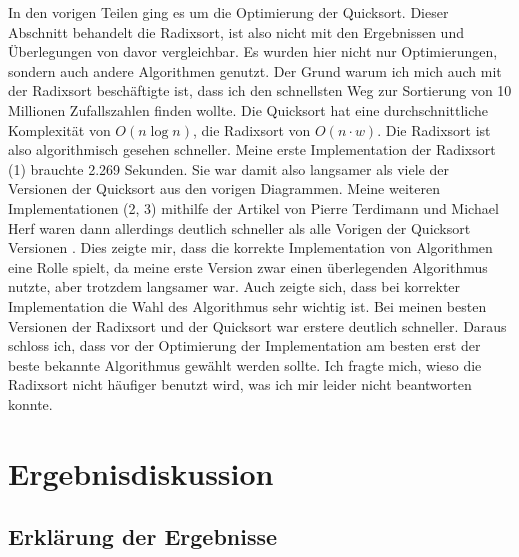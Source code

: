 \documentclass[11pt,a4paper]{article}
\begin{document}
\begin{bchart}[min=0, max=2.5, scale=1.9]
    \smallskip
    \smallskip
    \smallskip
\end{bchart}

In den vorigen Teilen ging es um die Optimierung der Quicksort. Dieser Abschnitt
behandelt die Radixsort, ist also nicht mit den Ergebnissen und Überlegungen von davor vergleichbar.
Es wurden hier nicht nur Optimierungen, sondern auch andere Algorithmen genutzt.
Der Grund warum ich mich auch mit der Radixsort beschäftigte ist, dass ich
den schnellsten Weg zur Sortierung von 10 Millionen Zufallszahlen finden wollte.
Die Quicksort hat eine durchschnittliche Komplexität von \boldmath$O(n\log n)$,
die Radixsort von \boldmath$O(n \cdot w)$. Die Radixsort ist also algorithmisch gesehen schneller.
Meine erste Implementation der Radixsort (1) brauchte 2.269 Sekunden. Sie war damit
also langsamer als viele der Versionen der Quicksort aus den vorigen Diagrammen.
Meine weiteren Implementationen (2, 3) mithilfe der Artikel von Pierre Terdimann und
Michael Herf waren dann allerdings deutlich schneller als alle Vorigen der Quicksort Versionen
\cite{terdiman} \cite{michael}.
Dies zeigte mir, dass die korrekte Implementation von Algorithmen eine Rolle spielt,
da meine erste Version zwar einen überlegenden Algorithmus nutzte, aber trotzdem
langsamer war. Auch zeigte sich, dass bei korrekter Implementation die Wahl des
Algorithmus sehr wichtig ist. Bei meinen besten Versionen der Radixsort und der Quicksort
war erstere deutlich schneller. Daraus schloss ich, dass vor der Optimierung der
Implementation am besten erst der beste bekannte Algorithmus gewählt werden sollte.
Ich fragte mich, wieso die Radixsort nicht häufiger benutzt wird, was ich mir leider nicht
beantworten konnte.

\clearpage

\section{Ergebnisdiskussion}

\subsection{Erklärung der Ergebnisse}
\end{document}
